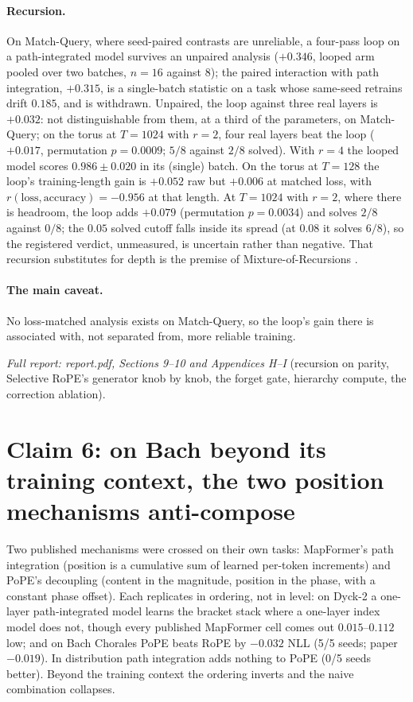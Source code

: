 \documentclass[10pt]{article}
\begin{document}
\paragraph{Recursion.} On Match-Query, where seed-paired contrasts are unreliable, a four-pass loop on a
path-integrated model survives an unpaired analysis ($+0.346$, looped arm pooled over two batches, $n=16$
against $8$); the paired interaction with path integration, $+0.315$, is a single-batch statistic on a task whose
same-seed retrains drift $0.185$, and is withdrawn.
Unpaired, the loop against three real layers is $+0.032$: not distinguishable from them, at a third of the parameters, on Match-Query; on the torus at $T=1024$ with $r=2$, four real layers beat the loop ($+0.017$, permutation $p=0.0009$; $5/8$ against $2/8$ solved). With $r=4$ the looped model scores $0.986\pm0.020$ in its
(single) batch. On the torus at $T=128$ the loop's training-length gain is $+0.052$ raw but $+0.006$ at matched loss, with
$r(\text{loss},\text{accuracy})=-0.956$ at that length. At $T=1024$ with $r=2$, where there is headroom, the loop adds
$+0.079$ (permutation $p=0.0034$) and solves $2/8$ against $0/8$; the $0.05$ solved cutoff falls inside its spread
(at $0.08$ it solves $6/8$), so the registered verdict, unmeasured, is uncertain rather than negative. That recursion substitutes for depth is the premise of
Mixture-of-Recursions \citep{bae2025mor}.

\paragraph{The main caveat.} No loss-matched analysis exists on Match-Query, so the loop's gain there is associated
with, not separated from, more reliable training.

\noindent\emph{Full report: report.pdf, Sections 9--10 and Appendices H--I} (recursion on parity, Selective RoPE's
generator knob by knob, the forget gate, hierarchy compute, the correction ablation).

\section{Claim 6: on Bach beyond its training context, the two position mechanisms anti-compose}

Two published mechanisms were crossed on their own tasks: MapFormer's path integration (position is a
cumulative sum of learned per-token increments) and PoPE's decoupling (content in the magnitude, position in
the phase, with a constant phase offset). Each replicates in ordering, not in level: on Dyck-2 a one-layer path-integrated model learns the
bracket stack where a one-layer index model does not, though every published MapFormer cell comes out
$0.015$--$0.112$ low; and on Bach Chorales PoPE beats RoPE by $-0.032$ NLL (5/5 seeds; paper $-0.019$). In distribution path integration adds nothing to PoPE (0/5 seeds
better). Beyond the training context the ordering inverts and the naive combination collapses.
\end{document}
